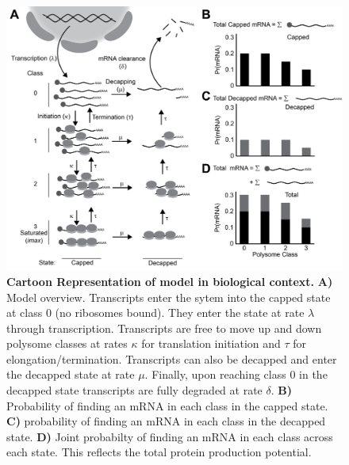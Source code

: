 \documentclass[10pt,letterpaper]{article}
\begin{document}
\begin{figure}[!h]
\begin{center}
\includegraphics[width=120mm]{Images/Figure1_biomodel_V3.png}
\caption{{\bf Cartoon Representation of model in biological context.} 
{\bf A)} Model overview. Transcripts enter the sytem into the capped state at class 0 (no ribosomes bound). They enter the state at rate $\lambda$ through transcription. Transcripts are free to move up and down polysome classes at rates $\kappa$ for translation initiation and $\tau$ for elongation/termination. Transcripts can also be decapped and enter the decapped state at rate $\mu$. Finally, upon reaching class 0 in the decapped state transcripts are fully degraded at rate $\delta$. {\bf B)} Probability of finding an mRNA in each class in the capped state. {\bf C)} probability of finding an mRNA in each class in the decapped state. {\bf D)} Joint probabilty of finding an mRNA in each class across each state. This reflects the total protein production potential.}
\label{fig1}
\end{center}
\end{figure}
\end{document}
